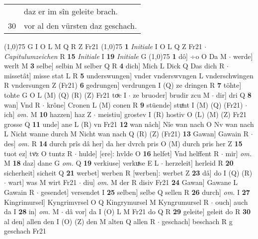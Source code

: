 \documentclass[8pt,a4paper,notitlepage]{article}
\begin{document}
\begin{table}[ht]
\begin{minipage}[t]{0.5\linewidth}
\begin{tabular}{rl}
 & daz er im sîn geleite brach.\\ 
30 & vor al den vürsten daz geschach.\\ 
\end{tabular}
\scriptsize
\line(1,0){75} \newline
G I O L M Q R Z Fr21 \newline
\line(1,0){75} \newline
\textbf{1} \textit{Initiale} I O L Q Z Fr21   $\cdot$ \textit{Capitulumzeichen} R  \textbf{15} \textit{Initiale} I  \textbf{19} \textit{Initiale} G  \newline
\line(1,0){75} \newline
\textbf{1} dô] ÷o O Da M  $\cdot$ werde] werlt M \textbf{3} selbe] selbin M selber Q R \textbf{4} dich] Mich L Dick Q Das dich R  $\cdot$ missetât] misse stat L R \textbf{5} underswungen] vnder vnderswvngen L vnderschwingen R vndersungen Z (Fr21) \textbf{6} gedrungen] verdrungen I (Q) ze dringen R \textbf{7} töhte] tohte G O L (M) (Q) (R) (Z) Fr21 toͮc I  $\cdot$ ze bruoder] brudir zcu M  $\cdot$ dir] dri Q \textbf{8} wan] Vnd R  $\cdot$ krône] Cronen L (M) conen R \textbf{9} stüende] stuͤnt I (M) (Q) (Fr21)  $\cdot$ ich] \textit{om.} M \textbf{10} hazzen] haz Z  $\cdot$ meistiu] grostev I (R) hostiv O (L) (M) (Z) Fr21 grosse Q \textbf{11} unde] ane L (R) vn Fr21 \textbf{12} wan nâch] Nîe wan nach O Nv wan nach L Nicht wanne durch M Nicht wan nach Q (R) (Z) (Fr21) \textbf{13} Gawan] Gawain R  $\cdot$ des] \textit{om.} R \textbf{14} durch prîs dâ her] da her dvrch pris O (M) durch pris her Z \textbf{15} tuot ez] tvͦz O tuntz R  $\cdot$ hulde] [ere]: hvlde O \textbf{16} helfet] Vnd helffent R  $\cdot$ mir] \textit{om.} M \textbf{18} daz] dane G \textit{om.} Q \textbf{19} verkiuse] verkuͯse E L  $\cdot$ herzeleit] herleid R \textbf{20} sicherheit] sicheit Q \textbf{21} werbet] werben R [werben]: werbet Z \textbf{23} dâ] do I (Q) (R)  $\cdot$ wart] was M wirt Fr21  $\cdot$ diu] \textit{om.} M der R disiv Fr21 \textbf{24} Gawan] Gawane L Gawain R  $\cdot$ gesendet] versendet I \textbf{25} selben] selbe Q sellen R \textbf{26} durch] \textit{om.} I \textbf{27} Kingrimursel] Kyngrimvrsel O Q Kingrymursel M Kyngrumursel R  $\cdot$ ouch] auch da I \textbf{28} in] \textit{om.} M  $\cdot$ dâ vor] da I (O) L M Fr21 do Q R \textbf{29} geleite] geleit do R \textbf{30} al den] allen den I (O) (Z) den M alten Q allen R  $\cdot$ geschach] beschach R g geschach Fr21 \newline
\end{minipage}
\hspace{0.5cm}

\end{table}
\end{document}

